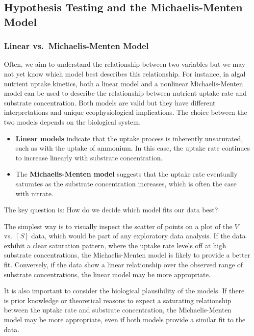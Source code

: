 \documentclass[
  letterpaper,
]{book}
\providecommand{\tightlist}{%
  \setlength{\itemsep}{0pt}\setlength{\parskip}{0pt}}\usepackage{longtable,booktabs,array}
\begin{document}
\subsection{Hypothesis Testing and the Michaelis-Menten
Model}\label{hypothesis-testing-and-the-michaelis-menten-model}

\subsubsection{Linear vs.~Michaelis-Menten
Model}\label{sec-linear-vs-mm}

Often, we aim to understand the relationship between two variables but
we may not yet know which model best describes this relationship. For
instance, in algal nutrient uptake kinetics, both a linear model and a
nonlinear Michaelis-Menten model can be used to describe the
relationship between nutrient uptake rate and substrate concentration.
Both models are valid but they have different interpretations and unique
ecophysiological implications. The choice between the two models depends
on the biological system.

\begin{itemize}
\tightlist
\item
  \textbf{Linear models} indicate that the uptake process is inherently
  unsaturated, such as with the uptake of ammonium. In this case, the
  uptake rate continues to increase linearly with substrate
  concentration.
\item
  The \textbf{Michaelis-Menten model} suggests that the uptake rate
  eventually saturates as the substrate concentration increases, which
  is often the case with nitrate.
\end{itemize}

The key question is: How do we decide which model fits our data best?

The simplest way is to visually inspect the scatter of points on a plot
of the \(V\) vs.~\([S]\) data, which would be part of any exploratory
data analysis. If the data exhibit a clear saturation pattern, where the
uptake rate levels off at high substrate concentrations, the
Michaelis-Menten model is likely to provide a better fit. Conversely, if
the data show a linear relationship over the observed range of substrate
concentrations, the linear model may be more appropriate.

It is also important to consider the biological plausibility of the
models. If there is prior knowledge or theoretical reasons to expect a
saturating relationship between the uptake rate and substrate
concentration, the Michaelis-Menten model may be more appropriate, even
if both models provide a similar fit to the data.
\end{document}
